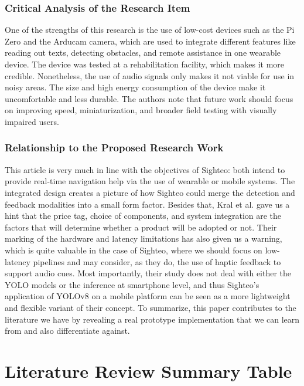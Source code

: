 \documentclass{FastFyp}
\begin{document}
\subsubsection{Critical Analysis of the Research Item}
One of the strengths of this research is the use of low-cost devices such as the Pi Zero and the Arducam camera, which are used to integrate different features like reading out texts, detecting obstacles, and remote assistance in one wearable device. The device was tested at a rehabilitation facility, which makes it more credible. Nonetheless, the use of audio signals only makes it not viable for use in noisy areas. The size and high energy consumption of the device make it uncomfortable and less durable. The authors note that future work should focus on improving speed, miniaturization, and broader field testing with visually impaired users.

\subsubsection{Relationship to the Proposed Research Work}

This article is very much in line with the objectives of Sighteo: both intend to provide real-time navigation help via the use of wearable or mobile systems. The integrated design creates a picture of how Sighteo could merge the detection and feedback modalities into a small form factor. Besides that, Kral et al. gave us a hint that the price tag, choice of components, and system integration are the factors that will determine whether a product will be adopted or not. Their marking of the hardware and latency limitations has also given us a warning, which is quite valuable in the case of Sighteo, where we should focus on low-latency pipelines and may consider, as they do, the use of haptic feedback to support audio cues. Most importantly, their study does not deal with either the YOLO models or the inference at smartphone level, and thus Sighteo’s application of YOLOv8 on a mobile platform can be seen as a more lightweight and flexible variant of their concept. To summarize, this paper contributes to the literature we have by revealing a real prototype implementation that we can learn from and also differentiate against.


\pagebreak

\section{Literature Review Summary Table}
\end{document}
